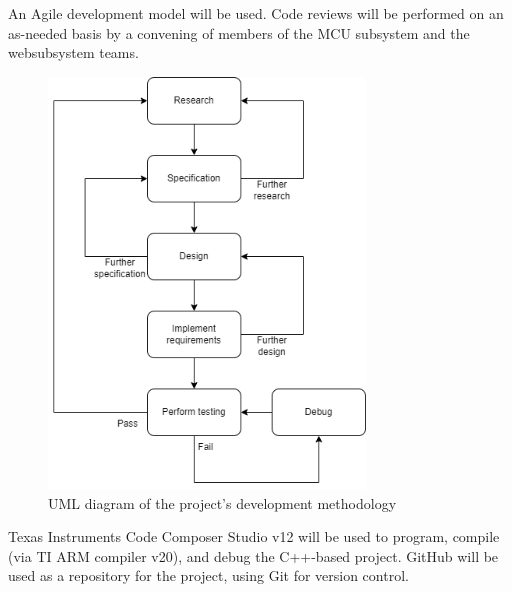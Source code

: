 \begin{flushleft}
    An Agile development model will be used. Code reviews will be performed on
    an as-needed basis by a convening of members of the MCU subsystem and the
    websubsystem teams.
    \begin{figure}[H]
        \label{mcu_agile_uml}
        \caption{UML diagram of the project's development methodology}
        \centering
        \includegraphics[width=0.75\textwidth]{images/mcu_agile_uml.png}
    \end{figure}
\end{flushleft}
\begin{flushleft}
    Texas Instruments Code Composer Studio v12 will be used to program,
    compile (via TI ARM compiler v20), and debug the C++-based project. GitHub
    will be used as a repository for the project, using Git for version
    control.
\end{flushleft}